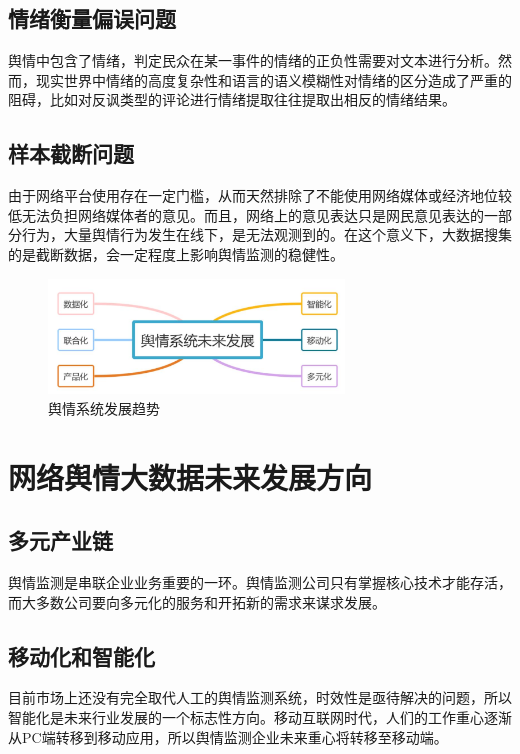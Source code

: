 \documentclass[11pt,a4paper,utf8]{article}
\begin{document}
\subsection{情绪衡量偏误问题}
舆情中包含了情绪，判定民众在某一事件的情绪的正负性需要对文本进行分析。然而，现实世界中情绪的高度复杂性和语言的语义模糊性对情绪的区分造成了严重的阻碍，比如对反讽类型的评论进行情绪提取往往提取出相反的情绪结果。

\subsection{样本截断问题}
由于网络平台使用存在一定门槛，从而天然排除了不能使用网络媒体或经济地位较低无法负担网络媒体者的意见。而且，网络上的意见表达只是网民意见表达的一部分行为，大量舆情行为发生在线下，是无法观测到的。在这个意义下，大数据搜集的是截断数据，会一定程度上影响舆情监测的稳健性。

\begin{figure}[H]
    \centering
    \includegraphics[width=0.7\textwidth]{images/舆情.png}  
    \caption{舆情系统发展趋势} 
\end{figure}  

\section{网络舆情大数据未来发展方向}

{\color{red}{以下部分由王红阳书写整理}} 

\subsection{多元产业链}
舆情监测是串联企业业务重要的一环。舆情监测公司只有掌握核心技术才能存活，而大多数公司要向多元化的服务和开拓新的需求来谋求发展。

\subsection{移动化和智能化}
目前市场上还没有完全取代人工的舆情监测系统，时效性是亟待解决的问题，所以智能化是未来行业发展的一个标志性方向。移动互联网时代，人们的工作重心逐渐从PC端转移到移动应用，所以舆情监测企业未来重心将转移至移动端。
\end{document}
